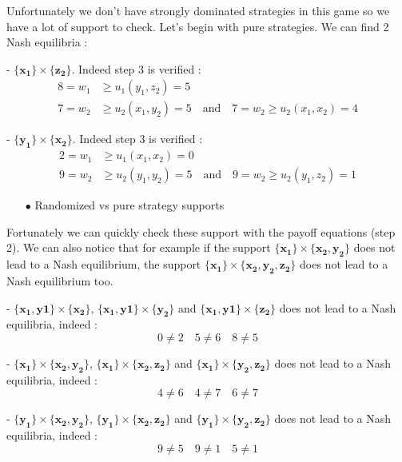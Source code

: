 Unfortunately we don't have strongly dominated strategies in this game so we have a lot of support to check. Let's begin with pure strategies. We can find 2 Nash equilibria :

- $\mathbf{\{x_1\}}\times\mathbf{\{z_2\}}$. Indeed step 3 is verified :
\begin{align*}
    8 =w_1&\ge u_1(y_1,z_2)=5   \\
    7=w_2&\ge u_2(x_1,y_2)=5 \quad \mbox{and} \quad 7=w_2\ge u_2(x_1,x_2)=4 
\end{align*}


- $\mathbf{\{y_1\}}\times\mathbf{\{x_2\}}$. Indeed step 3 is verified :
\begin{align*}
    2 =w_1&\ge u_1(x_1,x_2)=0 \\
    9=w_2&\ge u_2(y_1,y_2)=5  \quad \mbox{and} \quad  9=w_2\ge u_2(y_1,z_2)=1
\end{align*}

\begin{itemize}
  \item[$\bullet$] Randomized vs pure strategy supports
\end{itemize}

Fortunately we can quickly check these support with the payoff equations (step 2). We can also notice that for example if the support $\mathbf{\{x_1\}}\times\mathbf{\{x_2,y_2\}}$  does not lead to a Nash equilibrium, the support $\mathbf{\{x_1\}}\times\mathbf{\{x_2,y_2,z_2\}}$ does not lead to a Nash equilibrium too. 

- $\mathbf{\{x_1,y1\}}\times\mathbf{\{x_2\}}$, $\mathbf{\{x_1,y1\}}\times\mathbf{\{y_2\}}$ and $\mathbf{\{x_1,y1\}}\times\mathbf{\{z_2\}}$ does not lead to a Nash equilibria, indeed :
\begin{equation*}
    0\ne2 \quad 5\ne6 \quad 8\ne5
\end{equation*}

- $\mathbf{\{x_1\}}\times\mathbf{\{x_2,y_2\}}$, $\mathbf{\{x_1\}}\times\mathbf{\{x_2,z_2\}}$ and $\mathbf{\{x_1\}}\times\mathbf{\{y_2,z_2\}}$ does not lead to a Nash equilibria, indeed :
\begin{equation*}
    4\ne6 \quad 4\ne7 \quad 6\ne7
\end{equation*}

- $\mathbf{\{y_1\}}\times\mathbf{\{x_2,y_2\}}$, $\mathbf{\{y_1\}}\times\mathbf{\{x_2,z_2\}}$ and $\mathbf{\{y_1\}}\times\mathbf{\{y_2,z_2\}}$ does not lead to a Nash equilibria, indeed :
\begin{equation*}
    9\ne5 \quad 9\ne1 \quad 5\ne1
\end{equation*}


